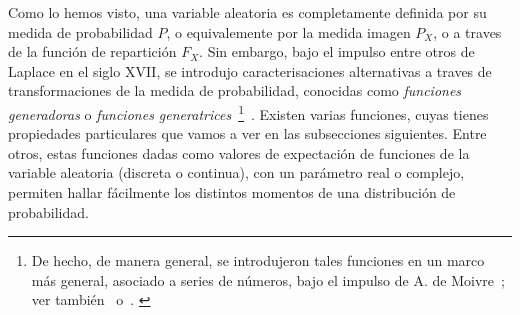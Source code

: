 




\label{Sec:MP:generatrices}

Como lo  hemos visto,  una variable aleatoria  es completamente definida  por su
medida de  probabilidad $P$,  o equivalemente  por la medida  imagen $P_X$,  o a
traves  de la funci\'on  de repartici\'on  $F_X$. Sin  embargo, bajo  el impulso
entre  otros  de  Laplace  en  el siglo  XVII,  se  introdujo  caracterisaciones
alternativas  a  traves  de  transformaciones  de  la  medida  de  probabilidad,
conocidas    como    {\em    funciones    generadoras}    o    {\em    funciones
  generatrices}~\footnote{De  hecho, de  manera general,  se  introdujeron tales
  funciones en un  marco m\'as general, asociado a series  de n\'umeros, bajo el
  impulso de A. de Moivre~\cite{Dem30}; ver tambi\'en~\cite{Sti30, Eul41, Eul50,
    Dem56}
  o~\cite[Sec.~1.2.9]{Knu97_v1}.        \label{Foot:MP:Generadora}}~\cite{Lap20}.
Existen varias funciones, cuyas tienes  propiedades particulares que vamos a ver
en las subsecciones siguientes. Entre  otros, estas funciones dadas como valores
de expectaci\'on  de funciones de  la variable aleatoria (discreta  o continua),
con un par\'ametro  real o complejo, permiten hallar  f\'acilmente los distintos
momentos de una distribuci\'on de probabilidad.




